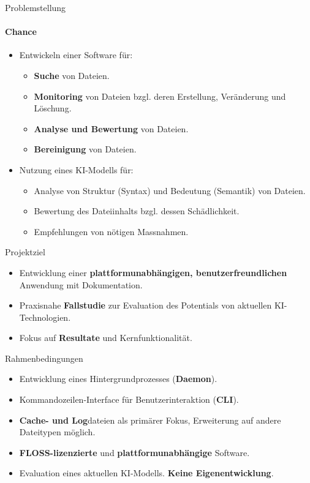 \documentclass[
    ngerman,%
    authorontitle=true,
]{bfhbeamer}
\begin{document}
    \begin{frame}{Problemstellung}
        \framesubtitle{Chance}
        \begin{itemize}

            \item Entwickeln einer Software f\"ur:
            \begin{itemize}
                \item \textbf{Suche} von Dateien.
                \item \textbf{Monitoring} von Dateien bzgl. deren Erstellung, Ver\"anderung und L\"oschung.
                \item \textbf{Analyse und Bewertung} von Dateien.
                \item \textbf{Bereinigung} von Dateien.
            \end{itemize}
            \item Nutzung eines KI-Modells f\"ur:
            \begin{itemize}
                \item Analyse von Struktur (Syntax) und Bedeutung (Semantik) von Dateien.
                \item Bewertung des Dateiinhalts bzgl.
                dessen Schädlichkeit.
                \item Empfehlungen von n\"otigen Massnahmen.
            \end{itemize}
        \end{itemize}
    \end{frame}

    \begin{frame}{Projektziel}
        \begin{itemize}
            \item Entwicklung einer \textbf{plattformunabh\"angigen, benutzerfreundlichen} Anwendung mit Dokumentation.
            \item Praxisnahe \textbf{Fallstudie} zur Evaluation des Potentials von aktuellen KI-Technologien.
            \item Fokus auf \textbf{Resultate} und Kernfunktionalit\"at.
        \end{itemize}
    \end{frame}

    \begin{frame}{Rahmenbedingungen}
        \begin{itemize}
            \item Entwicklung eines Hintergrundprozesses (\textbf{Daemon}).
            \item Kommandozeilen-Interface f\"ur Benutzerinteraktion (\textbf{CLI}).
            \item \textbf{Cache- und Log}dateien als prim\"arer Fokus, Erweiterung auf andere Dateitypen m\"oglich.
            \item \textbf{FLOSS-lizenzierte} und \textbf{plattformunabh\"angige} Software.
            \item Evaluation eines aktuellen KI-Modells. \textbf{Keine Eigenentwicklung}.
        \end{itemize}
    \end{frame}
\end{document}
